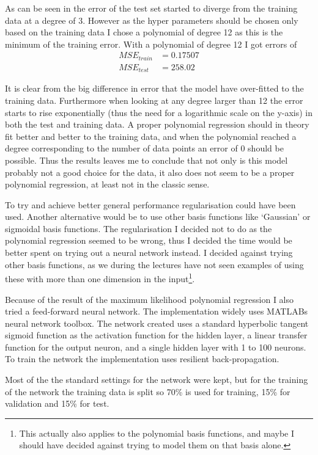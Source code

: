 \documentclass[a4paper, 11pt]{article}
\begin{document}
As can be seen in  the error of the test set started to diverge from the training data at a degree of 3. However as the hyper parameters should be chosen only based on the training data I chose a polynomial of degree 12 as this is the minimum of the training error. With a polynomial of degree 12 I got errors of
\begin{align*}
    MSE_{\mathit{train}} &= 0.17507 \\
    MSE_{\mathit{test}} &= 258.02
\end{align*}

It is clear from the big difference in error that the model have over-fitted to the training data. Furthermore when looking at any degree larger than 12 the error starts to rise exponentially (thus the need for a logarithmic scale on the y-axis) in both the test and training data. A proper polynomial regression should in theory fit better and better to the training data, and when the polynomial reached a degree corresponding to the number of data points an error of 0 should be possible. Thus the results leaves me to conclude that not only  is this model probably not a good choice for the data, it also does not seem to be a proper polynomial regression, at least not in the classic sense.

To try and achieve better general performance regularisation could have been used. Another alternative would be to use other basis functions like `Gaussian' or sigmoidal basis functions. The regularisation I decided not to do as the polynomial regression seemed to be wrong, thus I decided the time would be better spent on trying out a neural network instead. I decided against trying other basis functions, as we during the lectures have not seen examples of using these with more than one dimension in the input\footnote{This actually also applies to the polynomial basis functions, and maybe I should have decided against trying to model them on that basis alone.}.

Because of the result of the maximum likelihood polynomial regression I also tried a feed-forward neural network. The implementation widely uses MATLABs neural network toolbox. The network created uses a standard hyperbolic tangent sigmoid function as the activation function for the hidden layer, a linear transfer function for the output neuron, and a single hidden layer with 1 to 100 neurons. To train the network the implementation uses resilient back-propagation.

Most of the the standard settings for the network were kept, but for the training of the network the training data is split so 70\% is used for training, 15\% for validation and 15\% for test.
\end{document}
